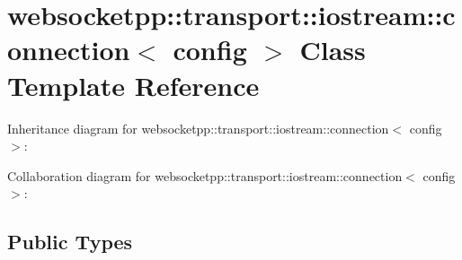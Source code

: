 \hypertarget{classwebsocketpp_1_1transport_1_1iostream_1_1connection}{}\section{websocketpp\+:\+:transport\+:\+:iostream\+:\+:connection$<$ config $>$ Class Template Reference}
\label{classwebsocketpp_1_1transport_1_1iostream_1_1connection}


Inheritance diagram for websocketpp\+:\+:transport\+:\+:iostream\+:\+:connection$<$ config $>$\+:


Collaboration diagram for websocketpp\+:\+:transport\+:\+:iostream\+:\+:connection$<$ config $>$\+:
\subsection*{Public Types}
